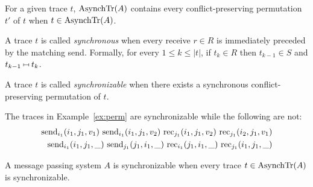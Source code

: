 \begin{lemma}
For a given trace $t$, $\mathrm{AsynchTr}({A})$ contains every conflict-preserving permutation $t'$ of $t$ when $t\in \mathrm{AsynchTr}({A})$.
\end{lemma}

A trace $t$ is called \emph{synchronous} when every receive $r\in R$ is immediately preceded by the matching send. Formally, for every $1\leq k\leq |t|$, if $t_k\in R$ then $t_{k-1}\in S$ and $t_{k-1}\match t_k$.

\begin{definition}
A trace $t$ is called \emph{synchronizable} when there exists a synchronous conflict-preserving permutation of $t$. 
\end{definition}

\begin{example}
The traces in Example~\ref{ex:perm} are synchronizable while the following are not:
\begin{align*}
\send{i_1}{i_1,j_1,v_1}\ 
\send{i_1}{i_1,j_1,v_2}\ 
\rec{j_1}{i_1,j_1,v_2}\ 
\rec{j_1}{i_2,j_1,v_1} \\
\send{i_1}{i_1,j_1,\_}\ 
\send{j_1}{j_1,i_1,\_}\ 
\rec{i_1}{j_1,i_1,\_}\ 
\rec{j_1}{i_1,j_1,\_} 
\end{align*}
\end{example}

A message passing system $A$ is synchronizable when every trace $t\in \mathrm{AsynchTr}({A})$ is  synchronizable.

